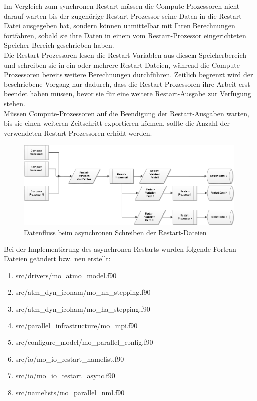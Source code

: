 \documentclass[a4paper,10pt,DIV14]{scrartcl}
\begin{document}
Im Vergleich zum synchronen Restart m\"ussen die Compute-Prozessoren nicht darauf warten bis der zugeh\"orige Restart-Prozessor
seine Daten in die Restart-Datei ausgegeben hat, sondern k\"onnen unmittelbar mit Ihren Berechnungen fortfahren, sobald sie
ihre Daten in einem vom Restart-Prozessor eingerichteten Speicher-Bereich geschrieben haben.\\

Die Restart-Prozessoren lesen die Restart-Variablen aus diesem Speicherbereich und schreiben sie in ein oder mehrere
Restart-Dateien, w\"ahrend die Compute-Prozessoren bereits weitere Berechnungen durchf\"uhren.
Zeitlich begrenzt wird der beschriebene Vorgang nur dadurch, dass die Restart-Prozessoren ihre Arbeit erst beendet
haben m\"ussen, bevor sie f\"ur eine weitere Restart-Ausgabe zur Verf\"ugung stehen.\\

M\"ussen Compute-Prozessoren auf die Beendigung der Restart-Ausgaben warten, bis sie einen weiteren Zeitschritt exportieren k\"onnen,
sollte die Anzahl der verwendeten Restart-Prozessoren erh\"oht werden.

\begin{figure}
 \includegraphics[width=\textwidth]{ICONImplementierungAsynchronerRestart-img002.png}
 \caption{Datenfluss beim asynchronen Schreiben der Restart-Dateien}
\end{figure} 

Bei der Implementierung des asynchronen Restarts wurden folgende Fortran-Dateien ge\"andert bzw. neu erstellt:
\begin{enumerate}
 \item src/drivers/mo\_atmo\_model.f90
 \item src/atm\_dyn\_iconam/mo\_nh\_stepping.f90
 \item src/atm\_dyn\_icoham/mo\_ha\_stepping.f90
 \item src/parallel\_infrastructure/mo\_mpi.f90
 \item src/configure\_model/mo\_parallel\_config.f90
 \item src/io/mo\_io\_restart\_namelist.f90
 \item src/io/mo\_io\_restart\_async.f90
 \item src/namelists/mo\_parallel\_nml.f90
\end{enumerate}
\end{document}
